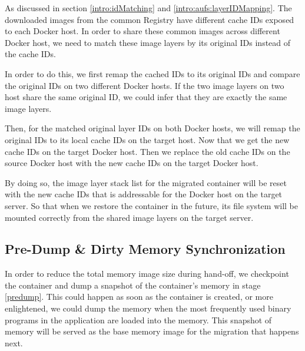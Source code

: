 As discussed in section \ref{intro:idMatching} and \ref{intro:aufs:layerIDMapping}. The downloaded images from the common Registry have different cache IDs exposed to each Docker host. In order to share these common images across different Docker host, we need to match these image layers by its original IDs instead of the cache IDs.

In order to do this, we first remap the cached IDs to its original IDs and compare the original IDs on two different Docker hosts. If the two image layers on two host share the same original ID, we could infer that they are exactly the same image layers. 

Then, for the matched original layer IDs on both Docker hosts, we will remap the original IDs to its local cache IDs on the target host. Now that we get the new cache IDs on the target Docker host. Then we replace the old cache IDs on the source Docker host with the new cache IDs on the target Docker host.  

By doing so, the image layer stack list for the migrated container will be reset with the new cache IDs that is addressable for the Docker host on the target server. So that when we restore the container in the future, its file system will be mounted correctly from the shared image layers on the target server.






\subsection{Pre-Dump \& Dirty Memory Synchronization} \label{design:memDiff}

In order to reduce the total memory image size during hand-off, we checkpoint the container and dump a snapshot of the container's memory in stage \ref{predump}. This could happen as soon as the container is created, or more enlightened, we could dump the memory when the most frequently used binary programs in the application are loaded into the memory. This snapshot of memory will be served as the base memory image for the migration that happens next.

